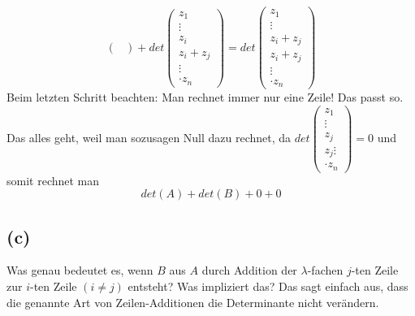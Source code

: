 \documentclass{article} %
\begin{document}
\begin{equation*}
\begin{pmatrix}
 \end{pmatrix}  + det \begin{pmatrix}
 z_1 \\
\vdots \\
z_i \\
z_i + z_j \\
\vdots \\
 \cdot z_n
 \end{pmatrix} = det \begin{pmatrix}
 z_1 \\
\vdots \\
z_i + z_j\\
z_i + z_j \\
\vdots \\
 \cdot z_n
 \end{pmatrix} 
\end{equation*}
Beim letzten Schritt beachten: Man rechnet immer nur eine Zeile! Das passt so. Das alles geht, weil man sozusagen Null dazu rechnet, da $det \begin{pmatrix}
 z_1 \\
\vdots \\
z_j \\
z_j
\vdots \\
 \cdot z_n
 \end{pmatrix} = 0$ und somit rechnet man
 \[det(A) + det(B) + 0 + 0  \]
 
 
\subsection{(c)}
Was genau bedeutet es, wenn $B$ aus $A$ durch Addition der $\lambda$-fachen $j$-ten Zeile zur
$i$-ten Zeile $(i \neq j)$ entsteht? Was impliziert das? Das sagt einfach aus, dass die genannte Art von Zeilen-Additionen die Determinante nicht verändern. \\
\end{document}
